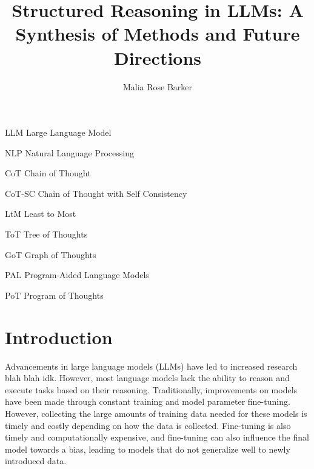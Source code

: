 \documentclass[project]{bsu-cs}  %
\title{Structured Reasoning in LLMs: A Synthesis of Methods and Future Directions}
\author{Malia Rose Barker}
\begin{document}
\frontmatter  %
% 
\buildFrontPages %
% 
\begin{listAbbreviations}
  \item[LLM] Large Language Model
  \item[NLP] Natural Language Processing
  \item[CoT] Chain of Thought
  \item[CoT-SC] Chain of Thought with Self Consistency
  \item[LtM] Least to Most
  \item[ToT] Tree of Thoughts
  \item[GoT] Graph of Thoughts
  \item[PAL] Program-Aided Language Models
  \item[PoT] Program of Thoughts
\end{listAbbreviations}
% 
% 
\mainmatter
% 
%
%
% 
\chapter{Introduction} \label{ch:intro}
Advancements in large language models (LLMs) have led to increased research blah blah idk. However, most language models lack the ability to reason and execute tasks based on their reasoning. Traditionally, improvements on models have been made through constant training and model parameter fine-tuning. However, collecting the large amounts of training data needed for these models is timely and costly depending on how the data is collected. Fine-tuning is also timely and computationally expensive, and fine-tuning can also influence the final model towards a bias, leading to models that do not generalize well to newly introduced data. 
\end{document}
